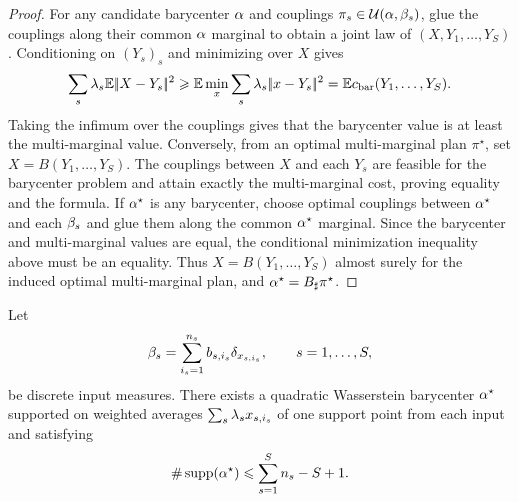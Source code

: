 \begin{proof}
	For any candidate barycenter $\alpha$ and couplings $\pi_s\in\mathcal{U}(\alpha,\beta_s)$, glue the couplings along their common $\alpha$ marginal to obtain a joint law of $(X,Y_1,\ldots,Y_S)$. Conditioning on $(Y_s)_s$ and minimizing over $X$ gives
	\[
		\sum_s\lambda_s\mathbb{E}|\!| X-Y_s |\!|^2
		\geqslant
		\mathbb{E}\min_x\sum_s\lambda_s|\!| x-Y_s |\!|^2
		=
		\mathbb{E} c_{\mathrm{bar}}(Y_1,\ldots,Y_S).
	\]
	Taking the infimum over the couplings gives that the barycenter value is at least the multi-marginal value. Conversely, from an optimal multi-marginal plan $\pi^\star$, set $X=B(Y_1,\ldots,Y_S)$. The couplings between $X$ and each $Y_s$ are feasible for the barycenter problem and attain exactly the multi-marginal cost, proving equality and the formula.
	If $\alpha^\star$ is any barycenter, choose optimal couplings between $\alpha^\star$ and each $\beta_s$ and glue them along the common $\alpha^\star$ marginal. Since the barycenter and multi-marginal values are equal, the conditional minimization inequality above must be an equality. Thus $X=B(Y_1,\ldots,Y_S)$ almost surely for the induced optimal multi-marginal plan, and $\alpha^\star=B_\sharp\pi^\star$.
\end{proof}

\begin{cor}\label{cor-discrete-barycenters}
	Let
	\[
		\beta_s=\sum_{i_s=1}^{n_s}b_{s,i_s}\delta_{x_{s,i_s}},
		\qquad s=1,\ldots,S,
	\]
	be discrete input measures. There exists a quadratic Wasserstein barycenter $\alpha^\star$ supported on weighted averages $\sum_s\lambda_s x_{s,i_s}$ of one support point from each input and satisfying
	\[
		\#\operatorname{supp}(\alpha^\star)
		\leqslant
		\sum_{s=1}^S n_s-S+1.
	\]
\end{cor}

